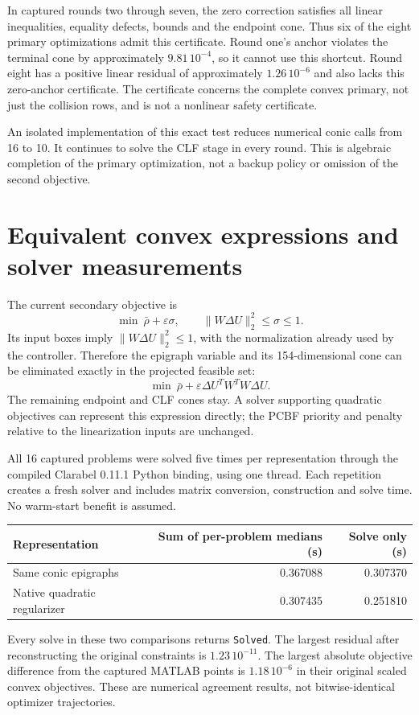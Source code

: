 \documentclass[11pt]{article}
\begin{document}
In captured rounds two through seven, the zero correction satisfies all
linear inequalities, equality defects, bounds and the endpoint cone. Thus
six of the eight primary optimizations admit this certificate. Round one's
anchor violates the terminal cone by approximately $9.81\,10^{-4}$, so it
cannot use this shortcut. Round eight has a positive linear residual of
approximately $1.26\,10^{-6}$ and also lacks this zero-anchor certificate.
The certificate concerns the complete convex primary, not just the collision
rows, and is not a nonlinear safety certificate.

An isolated implementation of this exact test reduces numerical conic calls
from 16 to 10. It continues to solve the CLF stage in every round. This is
algebraic completion of the primary optimization, not a backup policy or
omission of the second objective.

\section{Equivalent convex expressions and solver measurements}
The current secondary objective is
\[
 \min\ \bar\rho+\varepsilon\sigma,\qquad
 \|W\Delta U\|_2^2\le\sigma\le1.
\]
Its input boxes imply $\|W\Delta U\|_2^2\le1$, with the normalization already
used by the controller. Therefore the epigraph variable and its 154-dimensional
cone can be eliminated exactly in the projected feasible set:
\[
 \min\ \bar\rho+\varepsilon\Delta U^T W^T W\Delta U.
\]
The remaining endpoint and CLF cones stay. A solver supporting quadratic
objectives can represent this expression directly; the PCBF priority and
penalty relative to the linearization inputs are unchanged.

All 16 captured problems were solved five times per representation through
the compiled Clarabel 0.11.1 Python binding, using one thread. Each repetition
creates a fresh solver and includes matrix conversion, construction and solve
time. No warm-start benefit is assumed.
\begin{center}\small\begin{tabular}{lrr}\toprule
Representation & Sum of per-problem medians (s) & Solve only (s)\\\midrule
Same conic epigraphs & 0.367088 & 0.307370\\
Native quadratic regularizer & 0.307435 & 0.251810\\\bottomrule\end{tabular}\end{center}
Every solve in these two comparisons returns \texttt{Solved}. The largest
residual after reconstructing the original constraints is
$1.23\,10^{-11}$. The largest absolute objective difference from the captured
MATLAB points is $1.18\,10^{-6}$ in their original scaled convex objectives.
These are numerical agreement results, not bitwise-identical optimizer
trajectories.
\end{document}
